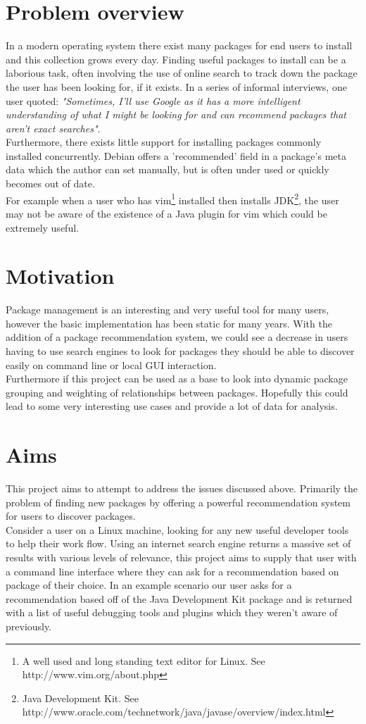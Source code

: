 \documentclass{l4proj}
\begin{document}
\section{Problem overview}
In a modern operating system there exist many packages for end users to install and this collection grows every day\cite{debpopcon}. Finding useful packages to install can be a laborious task, often involving the use of online search to track down the package the user has been looking for, if it exists. In a series of informal interviews, one user quoted: \emph{"Sometimes, I'll use Google as it has a more intelligent understanding of what I might be looking for and can recommend packages that aren't exact searches"}.\\
Furthermore, there exists little support for installing packages commonly installed concurrently. Debian offers a 'recommended' field in a package's meta data which the author can set manually, but is often under used or quickly becomes out of date.\\ For example when a user who has vim\footnote{A well used and long standing text editor for Linux. See http://www.vim.org/about.php} installed then installs JDK\footnote{Java Development Kit. See http://www.oracle.com/technetwork/java/javase/overview/index.html}, the user may not be aware of the existence of a Java plugin for vim which could be extremely useful.

\section{Motivation}
Package management is an interesting and very useful tool for many users, however the basic implementation has been static for many years. With the addition of a package recommendation system, we could see a decrease in users having to use search engines to look for packages they should be able to discover easily on command line or local GUI interaction.\\
Furthermore if this project can be used as a base to look into dynamic package grouping and weighting of relationships between packages. Hopefully this could lead to some very interesting use cases and provide a lot of data for analysis.
 
\section{Aims}
This project aims to attempt to address the issues discussed above. Primarily the problem of finding new packages by offering a powerful recommendation system for users to discover packages.\\
Consider a user on a Linux machine, looking for any new useful developer tools to help their work flow. Using an internet search engine returns a massive set of results with various levels of relevance, this project aims to supply that user with a command line interface where they can ask for a recommendation based on package of their choice. In an example scenario our user asks for a recommendation based off of the Java Development Kit package and is returned with a list of useful debugging tools and plugins which they weren't aware of previously.
\end{document}
